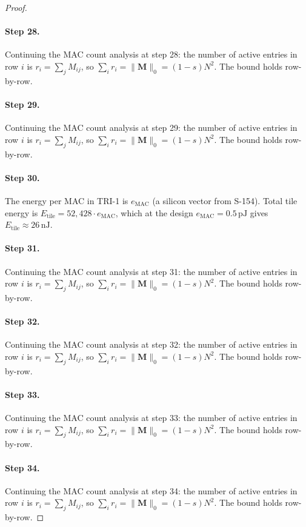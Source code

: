 \begin{proof}
\paragraph{Step 28.}
Continuing the MAC count analysis at step 28:
the number of active entries in row $i$ is $r_i = \sum_j M_{ij}$, so
$\sum_i r_i = \|\mathbf{M}\|_0 = (1-s)N^2$.  The bound holds row-by-row.

\paragraph{Step 29.}
Continuing the MAC count analysis at step 29:
the number of active entries in row $i$ is $r_i = \sum_j M_{ij}$, so
$\sum_i r_i = \|\mathbf{M}\|_0 = (1-s)N^2$.  The bound holds row-by-row.

\paragraph{Step 30.}
The energy per MAC in TRI-1 is $e_{\mathrm{MAC}}$
(a silicon vector from S-154).  Total tile energy is
$E_{\mathrm{tile}} = 52{,}428 \cdot e_{\mathrm{MAC}}$, which at the design
$e_{\mathrm{MAC}} = 0.5\,\mathrm{pJ}$ gives $E_{\mathrm{tile}} \approx 26\,\mathrm{nJ}$.
\cite{evci2020rigging}

\paragraph{Step 31.}
Continuing the MAC count analysis at step 31:
the number of active entries in row $i$ is $r_i = \sum_j M_{ij}$, so
$\sum_i r_i = \|\mathbf{M}\|_0 = (1-s)N^2$.  The bound holds row-by-row.

\paragraph{Step 32.}
Continuing the MAC count analysis at step 32:
the number of active entries in row $i$ is $r_i = \sum_j M_{ij}$, so
$\sum_i r_i = \|\mathbf{M}\|_0 = (1-s)N^2$.  The bound holds row-by-row.

\paragraph{Step 33.}
Continuing the MAC count analysis at step 33:
the number of active entries in row $i$ is $r_i = \sum_j M_{ij}$, so
$\sum_i r_i = \|\mathbf{M}\|_0 = (1-s)N^2$.  The bound holds row-by-row.

\paragraph{Step 34.}
Continuing the MAC count analysis at step 34:
the number of active entries in row $i$ is $r_i = \sum_j M_{ij}$, so
$\sum_i r_i = \|\mathbf{M}\|_0 = (1-s)N^2$.  The bound holds row-by-row.


\end{proof}
